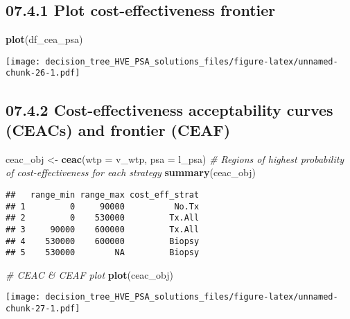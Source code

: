 \documentclass[
]{article}
\newenvironment{Shaded}{\begin{snugshade}}{\end{snugshade}}
\newcommand{\CommentTok}[1]{\textcolor[rgb]{0.56,0.35,0.01}{\textit{#1}}}
\newcommand{\DataTypeTok}[1]{\textcolor[rgb]{0.13,0.29,0.53}{#1}}
\newcommand{\KeywordTok}[1]{\textcolor[rgb]{0.13,0.29,0.53}{\textbf{#1}}}
\newcommand{\NormalTok}[1]{#1}
\newcommand{\StringTok}[1]{\textcolor[rgb]{0.31,0.60,0.02}{#1}}
\begin{document}
\hypertarget{plot-cost-effectiveness-frontier}{%
\subsection{07.4.1 Plot cost-effectiveness
frontier}\label{plot-cost-effectiveness-frontier}}

\begin{Shaded}
\begin{Highlighting}[]
\KeywordTok{plot}\NormalTok{(df_cea_psa) }
\end{Highlighting}
\end{Shaded}

\texttt{[image: decision\_tree\_HVE\_PSA\_solutions\_files/figure-latex/unnamed-chunk-26-1.pdf]}

\hypertarget{cost-effectiveness-acceptability-curves-ceacs-and-frontier-ceaf}{%
\subsection{07.4.2 Cost-effectiveness acceptability curves (CEACs) and
frontier
(CEAF)}\label{cost-effectiveness-acceptability-curves-ceacs-and-frontier-ceaf}}

\begin{Shaded}
\begin{Highlighting}[]
\NormalTok{ceac_obj <-}\StringTok{ }\KeywordTok{ceac}\NormalTok{(}\DataTypeTok{wtp =}\NormalTok{ v_wtp, }\DataTypeTok{psa =}\NormalTok{ l_psa)}
\CommentTok{# Regions of highest probability of cost-effectiveness for each strategy}
\KeywordTok{summary}\NormalTok{(ceac_obj)}
\end{Highlighting}
\end{Shaded}

\begin{verbatim}
##   range_min range_max cost_eff_strat
## 1         0     90000          No.Tx
## 2         0    530000         Tx.All
## 3     90000    600000         Tx.All
## 4    530000    600000         Biopsy
## 5    530000        NA         Biopsy
\end{verbatim}

\begin{Shaded}
\begin{Highlighting}[]
\CommentTok{# CEAC & CEAF plot}
\KeywordTok{plot}\NormalTok{(ceac_obj)}
\end{Highlighting}
\end{Shaded}

\texttt{[image: decision\_tree\_HVE\_PSA\_solutions\_files/figure-latex/unnamed-chunk-27-1.pdf]}
\end{document}
